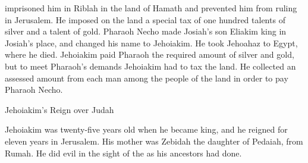 {imprisoned
him in Riblah
in the land
of Hamath
and prevented him from ruling
in Jerusalem.
He imposed
on
the land
a special tax of one hundred
talents
of silver
and a talent
of gold.
Pharaoh Necho
made Josiah’s
son
Eliakim
king
in Josiah’s
place,
and changed
his name
to Jehoiakim.
He took
Jehoahaz
to Egypt,
where
he died.
Jehoiakim
paid
Pharaoh
the required amount of silver
and gold,
but
to meet
Pharaoh’s
demands
Jehoiakim had to tax
the land.
He collected
an assessed amount
from each man
among the people
of the land
in order to pay
Pharaoh Necho.
\par }{\SH Jehoiakim’s Reign over Judah
\par }{\PP {}Jehoiakim
was twenty-five
years
old when he became king, and he reigned
for eleven
years
in Jerusalem.
His mother
was Zebidah
the daughter
of Pedaiah,
from
Rumah.
He did
evil
in the sight
of the
{}
as
his ancestors
had
done.

}
